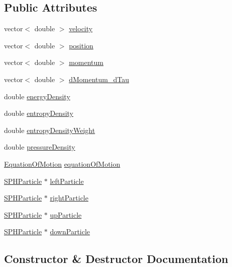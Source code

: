 \subsection*{Public Attributes}
\begin{DoxyCompactItemize}
\item 
vector$<$ double $>$ \hyperlink{classSPHParticle_a7fed7ec498a052562a13ec92c3c97178}{velocity}
\item 
vector$<$ double $>$ \hyperlink{classSPHParticle_ac78fc2da202ad42875390dc4ad389d69}{position}
\item 
vector$<$ double $>$ \hyperlink{classSPHParticle_acddbec39e298ca949be6d3ab524e4be0}{momentum}
\item 
vector$<$ double $>$ \hyperlink{classSPHParticle_a82f62cc851dfe2880476a410f6cd440f}{d\+Momentum\+\_\+d\+Tau}
\item 
double \hyperlink{classSPHParticle_a06b72d633eedc682138618492aa6b5e4}{energy\+Density}
\item 
double \hyperlink{classSPHParticle_a444f3b6a414b38d9bc0a59f129f3cc8c}{entropy\+Density}
\item 
double \hyperlink{classSPHParticle_a6e6969476bac4b63b3b847cad236b2e3}{entropy\+Density\+Weight}
\item 
double \hyperlink{classSPHParticle_ac2ba30a4355e6ae7a4e4c4649f46f63a}{pressure\+Density}
\item 
\hyperlink{classEquationOfMotion}{Equation\+Of\+Motion} \hyperlink{classSPHParticle_aebfaab8941bb19c441582ab044ba66e3}{equation\+Of\+Motion}
\item 
\hyperlink{classSPHParticle}{S\+P\+H\+Particle} $\ast$ \hyperlink{classSPHParticle_a90fd1fe036c3819fb2afdd5f92fbf940}{left\+Particle}
\item 
\hyperlink{classSPHParticle}{S\+P\+H\+Particle} $\ast$ \hyperlink{classSPHParticle_ac3d8cdba87d075fd8f90d98cef028491}{right\+Particle}
\item 
\hyperlink{classSPHParticle}{S\+P\+H\+Particle} $\ast$ \hyperlink{classSPHParticle_af7b1215febe23bc856039ff338594e9f}{up\+Particle}
\item 
\hyperlink{classSPHParticle}{S\+P\+H\+Particle} $\ast$ \hyperlink{classSPHParticle_a7fb3bc4eb999315c4ec62bd20c763656}{down\+Particle}
\end{DoxyCompactItemize}


\subsection{Constructor \& Destructor Documentation}
\hypertarget{classSPHParticle_a0358b0e53801799041387090391aa968}{}
